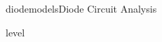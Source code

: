 \begin{mainquestion}{diodemodels}{Diode Circuit Analysis}
\begin{partquestion}{level}

\end{partquestion}

\end{mainquestion}
